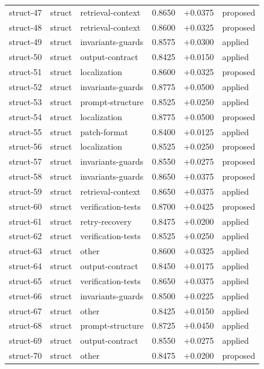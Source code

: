 \begin{center}
\begin{longtable}{llp{5.2cm}rrl}
struct-47 & struct & retrieval-context & 0.8650 & +0.0375 & proposed \\
struct-48 & struct & retrieval-context & 0.8600 & +0.0325 & proposed \\
struct-49 & struct & invariants-guards & 0.8575 & +0.0300 & applied \\
struct-50 & struct & output-contract & 0.8425 & +0.0150 & applied \\
struct-51 & struct & localization & 0.8600 & +0.0325 & proposed \\
struct-52 & struct & invariants-guards & 0.8775 & +0.0500 & applied \\
struct-53 & struct & prompt-structure & 0.8525 & +0.0250 & applied \\
struct-54 & struct & localization & 0.8775 & +0.0500 & proposed \\
struct-55 & struct & patch-format & 0.8400 & +0.0125 & applied \\
struct-56 & struct & localization & 0.8525 & +0.0250 & proposed \\
struct-57 & struct & invariants-guards & 0.8550 & +0.0275 & proposed \\
struct-58 & struct & invariants-guards & 0.8650 & +0.0375 & proposed \\
struct-59 & struct & retrieval-context & 0.8650 & +0.0375 & applied \\
struct-60 & struct & verification-tests & 0.8700 & +0.0425 & proposed \\
struct-61 & struct & retry-recovery & 0.8475 & +0.0200 & applied \\
struct-62 & struct & verification-tests & 0.8525 & +0.0250 & applied \\
struct-63 & struct & other & 0.8600 & +0.0325 & applied \\
struct-64 & struct & output-contract & 0.8450 & +0.0175 & applied \\
struct-65 & struct & verification-tests & 0.8650 & +0.0375 & applied \\
struct-66 & struct & invariants-guards & 0.8500 & +0.0225 & applied \\
struct-67 & struct & other & 0.8425 & +0.0150 & applied \\
struct-68 & struct & prompt-structure & 0.8725 & +0.0450 & applied \\
struct-69 & struct & output-contract & 0.8550 & +0.0275 & applied \\
struct-70 & struct & other & 0.8475 & +0.0200 & proposed \\

\end{longtable}
\end{center}
